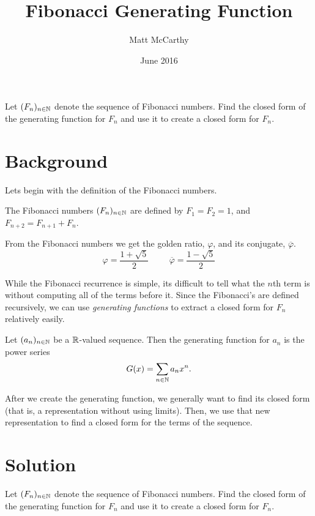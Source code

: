 \documentclass[notitlepage]{problem-solving}
\author{Matt McCarthy}
\title{Fibonacci Generating Function}
\date{June 2016}
\begin{document}
\maketitle

\begin{problem*}
	Let $(F_n)_{n\in\mathbb{N}}$ denote the sequence of Fibonacci numbers.
	Find the closed form of the generating function for $F_n$ and use it to create a closed form for $F_n$.
\end{problem*}

\section{Background}

Lets begin with the definition of the Fibonacci numbers.
\begin{definition}
	The Fibonacci numbers $(F_n)_{n\in\mathbb{N}}$ are defined by $F_1=F_2=1$, and $F_{n+2}=F_{n+1}+F_n$.
\end{definition}

From the Fibonacci numbers we get the golden ratio, $\varphi$, and its conjugate, $\overline{\varphi}$.
\[
	\varphi = \frac{1+\sqrt{5}}{2} \hspace{1cm} \overline{\varphi} = \frac{1-\sqrt{5}}{2}
\]

While the Fibonacci recurrence is simple, its difficult to tell what the $n$th term is without computing all of the terms before it.
Since the Fibonacci's are defined recursively, we can use \textit{generating functions} to extract a closed form for $F_n$ relatively easily.

\begin{definition}
	Let $(a_n)_{n\in\mathbb{N}}$ be a $\mathbb{R}$-valued sequence.
	Then the generating function for $a_n$ is the power series
	\[
		G(x) = \sum_{n\in\mathbb{N}} a_nx^n.
	\]
\end{definition}

After we create the generating function, we generally want to find its closed form (that is, a representation without using limits).
Then, we use that new representation to find a closed form for the terms of the sequence.

\section{Solution}

\begin{problem*}
	Let $(F_n)_{n\in\mathbb{N}}$ denote the sequence of Fibonacci numbers.
	Find the closed form of the generating function for $F_n$ and use it to create a closed form for $F_n$.
\end{problem*}
\end{document}

